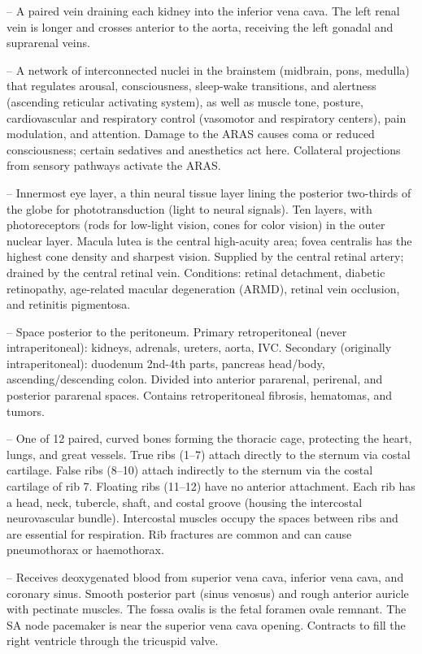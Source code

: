 -- A paired vein draining each kidney into the inferior vena cava. The left renal vein is longer and crosses anterior to the aorta, receiving the left gonadal and suprarenal veins.

-- A network of interconnected nuclei in the brainstem (midbrain, pons, medulla) that regulates arousal, consciousness, sleep-wake transitions, and alertness (ascending reticular activating system), as well as muscle tone, posture, cardiovascular and respiratory control (vasomotor and respiratory centers), pain modulation, and attention. Damage to the ARAS causes coma or reduced consciousness; certain sedatives and anesthetics act here. Collateral projections from sensory pathways activate the ARAS.

-- Innermost eye layer, a thin neural tissue layer lining the posterior two-thirds of the globe for phototransduction (light to neural signals). Ten layers, with photoreceptors (rods for low-light vision, cones for color vision) in the outer nuclear layer. Macula lutea is the central high-acuity area; fovea centralis has the highest cone density and sharpest vision. Supplied by the central retinal artery; drained by the central retinal vein. Conditions: retinal detachment, diabetic retinopathy, age-related macular degeneration (ARMD), retinal vein occlusion, and retinitis pigmentosa.

-- Space posterior to the peritoneum. Primary retroperitoneal (never intraperitoneal): kidneys, adrenals, ureters, aorta, IVC. Secondary (originally intraperitoneal): duodenum 2nd-4th parts, pancreas head/body, ascending/descending colon. Divided into anterior pararenal, perirenal, and posterior pararenal spaces. Contains retroperitoneal fibrosis, hematomas, and tumors.

-- One of 12 paired, curved bones forming the thoracic cage, protecting the heart, lungs, and great vessels. True ribs (1--7) attach directly to the sternum via costal cartilage. False ribs (8--10) attach indirectly to the sternum via the costal cartilage of rib 7. Floating ribs (11--12) have no anterior attachment. Each rib has a head, neck, tubercle, shaft, and costal groove (housing the intercostal neurovascular bundle). Intercostal muscles occupy the spaces between ribs and are essential for respiration. Rib fractures are common and can cause pneumothorax or haemothorax.

-- Receives deoxygenated blood from superior vena cava, inferior vena cava, and coronary sinus. Smooth posterior part (sinus venosus) and rough anterior auricle with pectinate muscles. The fossa ovalis is the fetal foramen ovale remnant. The SA node pacemaker is near the superior vena cava opening. Contracts to fill the right ventricle through the tricuspid valve.

